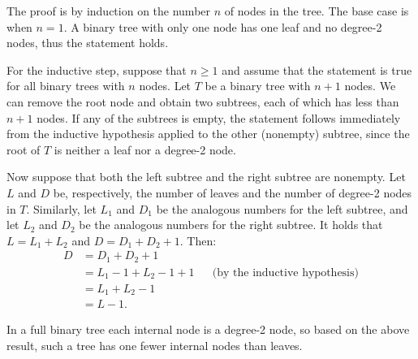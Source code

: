 The proof is by induction on the number $n$ of nodes in the tree.
The base case is when $n=1$.
A binary tree with only one node has one leaf and no degree-2 nodes, thus the statement holds.

For the inductive step, suppose that $n\ge1$ and assume that the statement is true for all binary trees with $n$ nodes.
Let $T$ be a binary tree with $n+1$ nodes.
We can remove the root node and obtain two subtrees, each of which has less than $n+1$ nodes.
If any of the subtrees is empty, the statement follows immediately from the inductive hypothesis applied to the other (nonempty) subtree, since the root of $T$ is neither a leaf nor a degree-2 node.

Now suppose that both the left subtree and the right subtree are nonempty.
Let $L$ and $D$ be, respectively, the number of leaves and the number of degree-2 nodes in $T$.
Similarly, let $L_1$ and $D_1$ be the analogous numbers for the left subtree, and let $L_2$ and $D_2$ be the analogous numbers for the right subtree.
It holds that $L=L_1+L_2$ and $D=D_1+D_2+1$.
Then:
\begin{align*}
    D &= D_1+D_2+1 \\
    &= L_1-1+L_2-1+1 && \text{(by the inductive hypothesis)} \\
    &= L_1+L_2-1 \\
    &= L-1.
\end{align*}

In a full binary tree each internal node is a degree-2 node, so based on the above result, such a tree has one fewer internal nodes than leaves.
